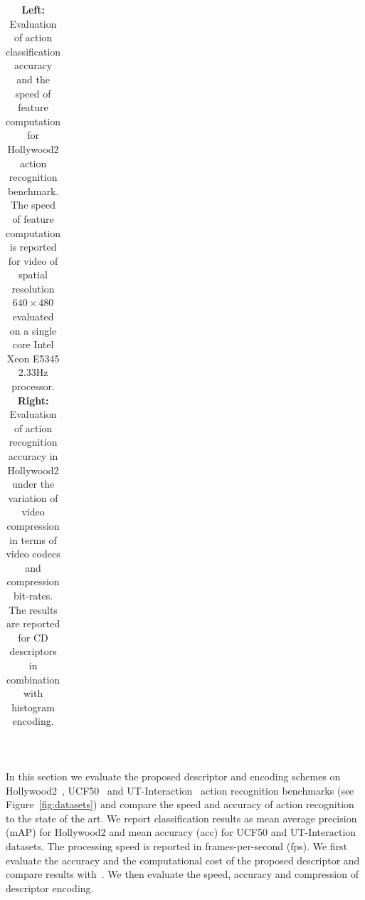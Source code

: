 \documentclass[10pt,twocolumn,letterpaper]{article}
\begin{document}
\begin{table}[t!]
\begin{center}
\begin{tabular}{p{}p{}}
\end{tabular}
\mbox{}\vspace{.1cm}\\
\caption{{\bf Left:} Evaluation of action classification accuracy and the speed of feature computation for Hollywood2 action recognition benchmark. The speed of feature computation is reported for video of spatial resolution $640\times480$ evaluated on a single core Intel Xeon E5345 2.33Hz processor.
{\bf Right:} Evaluation of action recognition accuracy in Hollywood2 under the variation of video compression in terms of video codecs and compression bit-rates. The results are reported for CD descriptors in combination with histogram encoding.
\vspace{-.4cm}}
\label{tab:HWD2}
\end{center}
\end{table}


In this section we evaluate the proposed descriptor and encoding schemes on Hollywood2~\cite{Marszalek09}, UCF50~\cite{Reddy12} and UT-Interaction~\cite{Ryoo10} action recognition benchmarks (see Figure~\ref{fig:datasets}) and compare the speed and accuracy of action recognition  to the state of the art. We report classification results as mean average precision (mAP) for Hollywood2 and mean accuracy (acc) for UCF50 and UT-Interaction datasets. The processing speed is reported in frames-per-second (fps). We first evaluate the accuracy and the computational cost of the proposed descriptor and compare results with~\cite{Wang12}. We then evaluate the speed, accuracy and compression of descriptor encoding.

\end{document}
